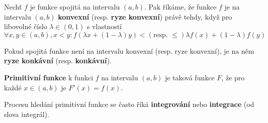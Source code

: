\begin{definition}
  Nechť $f$ je funkce spojitá na intervalu $(a,b)$. Pak říkáme, že funkce $f$ je na intervalu $(a,b)$ \textbf{konvexní} (resp. \textbf{ryze konvexní}) právě tehdy, když pro libovolné číslo $\lambda \in (0,1)$ s vlastností $\forall x,y\in (a,b),x<y:f(\lambda x+(1-\lambda )y) < (\text{resp. } \leq) \lambda f(x)+(1-\lambda )f(y)$

  Pokud spojitá funkce není na intervalu konvexní (resp. ryze konvexní), je na něm \textbf{ryze konkávní} (resp. \textbf{konkávní}).
\end{definition}

\begin{definition}
  \textbf{Primitivní funkce} k funkci $f$ na intervalu $(a,b)$ je taková funkce $F$, že pro každé $x\in (a,b)$ je $F'(x)=f(x)$.

  Procesu hledání primitivní funkce se často říká \textbf{integrování} nebo \textbf{integrace} (od slova integrál).
\end{definition}
